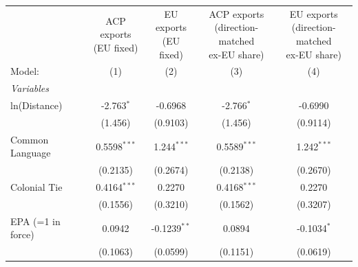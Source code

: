 
\begingroup
\centering
\begin{tabular}{lcccc}
   \tabularnewline \midrule \midrule
                                 & \makecell{ACP exports\\(EU fixed)}    & \makecell{EU exports\\(EU fixed)}    & \makecell{ACP exports\\(direction-matched\\ex-EU share)}      & \makecell{EU exports\\(direction-matched\\ex-EU share)} \\        
   Model:                        & (1)                                   & (2)                                  & (3)                                                           & (4)\\  
   \midrule
   \emph{Variables}\\
   ln(Distance)                  & -2.763$^{*}$                          & -0.6968                              & -2.766$^{*}$                                                  & -0.6990\\   
                                 & (1.456)                               & (0.9103)                             & (1.456)                                                       & (0.9114)\\   
   Common Language               & 0.5598$^{***}$                        & 1.244$^{***}$                        & 0.5589$^{***}$                                                & 1.242$^{***}$\\   
                                 & (0.2135)                              & (0.2674)                             & (0.2138)                                                      & (0.2670)\\   
   Colonial Tie                  & 0.4164$^{***}$                        & 0.2270                               & 0.4168$^{***}$                                                & 0.2270\\   
                                 & (0.1556)                              & (0.3210)                             & (0.1562)                                                      & (0.3207)\\   
   EPA (=1 in force)             & 0.0942                                & -0.1239$^{**}$                       & 0.0894                                                        & -0.1034$^{*}$\\   
                                 & (0.1063)                              & (0.0599)                             & (0.1151)                                                      & (0.0619)\\   

\end{tabular}

